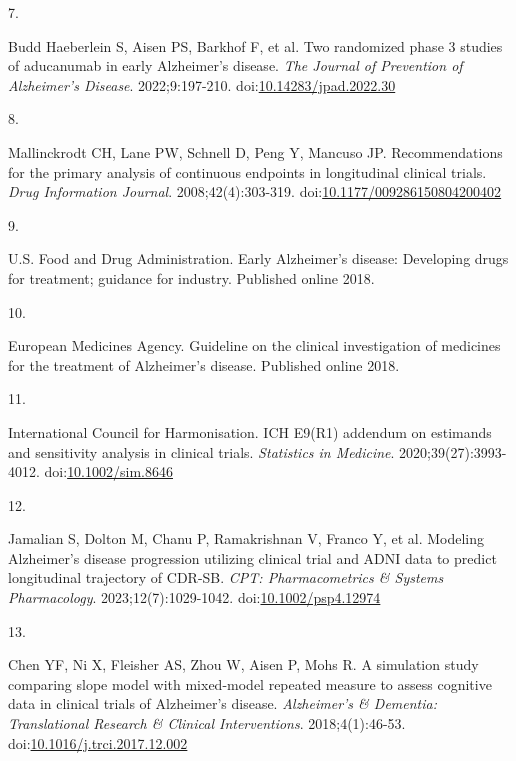 \documentclass[
  11pt,
]{article}
\newlength{\cslhangindent}
\newlength{\csllabelwidth}
\newenvironment{CSLReferences}[2] %
 {\begin{list}{}{%
  \setlength{\itemindent}{0pt}
  \setlength{\leftmargin}{0pt}
  \setlength{\parsep}{0pt}
  \ifodd #1
   \setlength{\leftmargin}{\cslhangindent}
   \setlength{\itemindent}{-1\cslhangindent}
  \fi
  \setlength{\itemsep}{#2\baselineskip}}}
 {\end{list}}
\newcommand{\CSLLeftMargin}[1]{\parbox[t]{\csllabelwidth}{\strut#1\strut}}
\newcommand{\CSLRightInline}[1]{\parbox[t]{\linewidth - \csllabelwidth}{\strut#1\strut}}
\begin{document}
\begin{CSLReferences}{0}{1}
\CSLLeftMargin{7. }%
\CSLRightInline{{Budd Haeberlein S, Aisen PS, Barkhof F, et al.} Two randomized phase 3 studies of aducanumab in early {Alzheimer's} disease. \emph{The Journal of Prevention of Alzheimer's Disease}. 2022;9:197-210. doi:\href{https://doi.org/10.14283/jpad.2022.30}{10.14283/jpad.2022.30}}

\CSLLeftMargin{8. }%
\CSLRightInline{Mallinckrodt CH, Lane PW, Schnell D, Peng Y, Mancuso JP. Recommendations for the primary analysis of continuous endpoints in longitudinal clinical trials. \emph{Drug Information Journal}. 2008;42(4):303-319. doi:\href{https://doi.org/10.1177/009286150804200402}{10.1177/009286150804200402}}

\CSLLeftMargin{9. }%
\CSLRightInline{U.S. Food and Drug Administration. Early {Alzheimer's} disease: Developing drugs for treatment; guidance for industry. Published online 2018.}

\CSLLeftMargin{10. }%
\CSLRightInline{European Medicines Agency. Guideline on the clinical investigation of medicines for the treatment of {Alzheimer's} disease. Published online 2018.}

\CSLLeftMargin{11. }%
\CSLRightInline{International Council for Harmonisation. ICH {E9(R1)} addendum on estimands and sensitivity analysis in clinical trials. \emph{Statistics in Medicine}. 2020;39(27):3993-4012. doi:\href{https://doi.org/10.1002/sim.8646}{10.1002/sim.8646}}

\CSLLeftMargin{12. }%
\CSLRightInline{{Jamalian S, Dolton M, Chanu P, Ramakrishnan V, Franco Y, et al.} Modeling {Alzheimer's} disease progression utilizing clinical trial and {ADNI} data to predict longitudinal trajectory of {CDR-SB}. \emph{CPT: Pharmacometrics \& Systems Pharmacology}. 2023;12(7):1029-1042. doi:\href{https://doi.org/10.1002/psp4.12974}{10.1002/psp4.12974}}

\CSLLeftMargin{13. }%
\CSLRightInline{Chen YF, Ni X, Fleisher AS, Zhou W, Aisen P, Mohs R. A simulation study comparing slope model with mixed-model repeated measure to assess cognitive data in clinical trials of {Alzheimer's} disease. \emph{Alzheimer's \& Dementia: Translational Research \& Clinical Interventions}. 2018;4(1):46-53. doi:\href{https://doi.org/10.1016/j.trci.2017.12.002}{10.1016/j.trci.2017.12.002}}


\end{CSLReferences}
\end{document}
